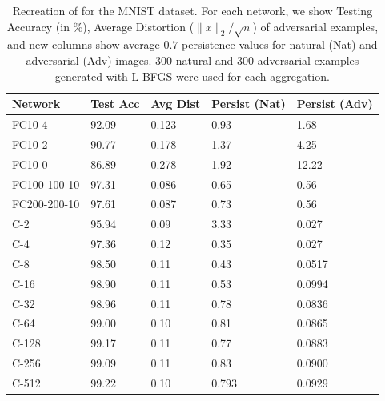 \begin{table}[ht]
\centering
\caption{Recreation of \citet[Table 1]{Szegedy2013} for the MNIST dataset.  For each network, we show Testing Accuracy (in \%), Average Distortion ($\|x\|_2/\sqrt{n}$) of adversarial examples, and new columns show average $0.7$-persistence values for natural (Nat) and adversarial (Adv) images. 300 natural and 300 adversarial examples generated with L-BFGS were used for each aggregation.}
\label{table1}
\begin{tabular}{lllll}
\toprule
Network & Test Acc & Avg Dist & Persist (Nat) & Persist (Adv) \\
\midrule
FC10-4 & 92.09 & 0.123 & 0.93 & 1.68\\
FC10-2 & 90.77 & 0.178 & 1.37 & 4.25\\
FC10-0 & 86.89 & 0.278 & 1.92 & 12.22\\
FC100-100-10 & 97.31 & 0.086 & 0.65 & 0.56 \\
FC200-200-10 & 97.61 & 0.087 & 0.73 & 0.56 \\
\midrule
C-2 & 95.94 & 0.09 & 3.33 & 0.027 \\
C-4 & 97.36 & 0.12 & 0.35 & 0.027 \\
C-8 & 98.50 & 0.11 & 0.43  & 0.0517 \\
C-16 & 98.90 & 0.11 & 0.53 & 0.0994 \\
C-32 & 98.96 & 0.11 & 0.78 & 0.0836 \\
C-64 & 99.00 & 0.10 & 0.81 & 0.0865 \\
C-128 & 99.17 & 0.11 & 0.77 & 0.0883 \\
C-256 & 99.09 & 0.11  & 0.83 & 0.0900 \\
C-512 & 99.22 & 0.10 & 0.793 & 0.0929 \\
\bottomrule
\end{tabular}
\end{table}

